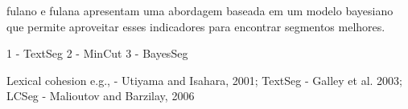 fulano e fulana apresentam uma abordagem baseada em um modelo bayesiano que permite aproveitar esses indicadores para encontrar segmentos melhores.







1 - TextSeg
2 - MinCut
3 - BayesSeg


Lexical cohesion e.g., 
	- Utiyama and Isahara,     2001; {TextSeg}
	- Galley et al.            2003; {LCSeg}
	- Malioutov and Barzilay,  2006  {}





